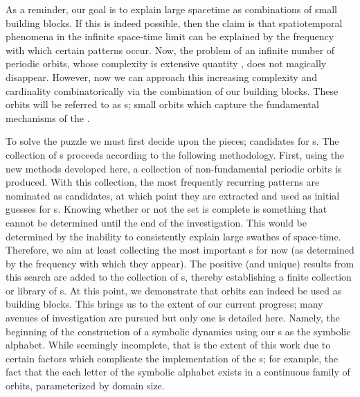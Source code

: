 As a reminder, our goal is to explain large spacetime as combinations of small building blocks.
If this is indeed possible, then the claim is that spatiotemporal phenomena in the infinite space-time
limit can be explained by the frequency with which certain patterns occur. Now, the problem of 
an infinite number of periodic orbits, whose complexity is extensive quantity , 
does not magically disappear. However, now we can approach this increasing complexity and cardinality
combinatorically via the combination of our building blocks. These orbits will be referred to 
as {\fpo}s; small orbits which capture the fundamental {\spt} mechanisms of the \KSe.

To solve the puzzle we must first decide upon the pieces; candidates for {\fpo}s. 
The collection of {\fpo}s proceeds according to the following methodology. First, using
the new {\spt} methods developed here, a collection of non-fundamental periodic orbits
is produced. With this collection, the most frequently recurring patterns are
nominated as {\fpo} candidates, at which point they are extracted and used as initial guesses for {\fpo}s.
Knowing whether or not the set is complete is something that cannot be determined until the
end of the investigation. This would be determined by the inability to consistently explain large swathes of
space-time. Therefore, we aim at least collecting the most important {\fpo}s for now (as determined by the
frequency with which they appear).
The positive (and unique) results from this search are added to the collection of {\fpo}s, thereby 
establishing a finite collection or library of {\fpo}s. At this point, we demonstrate that orbits
can indeed be used as building blocks. This brings us to the extent of our current progress; many
avenues of investigation are pursued but only one is detailed here. Namely, the beginning of
the construction of a {\spt} symbolic dynamics using our {\fpo}s as the symbolic alphabet.
While seemingly incomplete, that is the extent of this work due to certain factors which complicate
the implementation of the {\symbolic}s; for example, the fact that the each letter of the symbolic
alphabet exists in a continuous family of orbits, parameterized by {\spt} domain size. 

